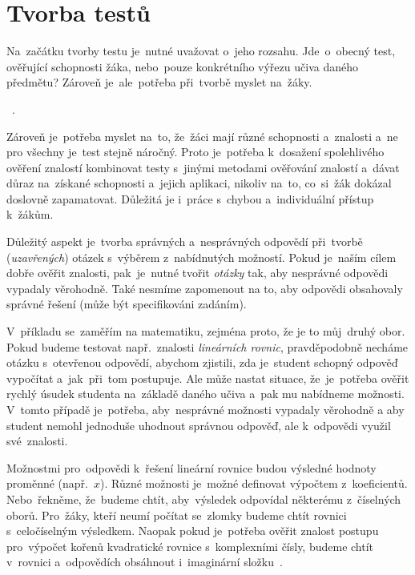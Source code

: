 \documentclass[11pt,a4paper]{report}
\begin{document}
        \section{Tvorba testů}
            Na~začátku tvorby testu je~nutné uvažovat o~jeho rozsahu. Jde~o~obecný test, ověřující schopnosti žáka, nebo~pouze konkrétního výřezu učiva daného předmětu?
            Zároveň je~ale~potřeba při~tvorbě myslet na~žáky.

            ~\cite{Suchoradsky:testy}.

            Zároveň je~potřeba myslet na~to, že~žáci mají různé schopnosti a~znalosti a~ne pro všechny je~test stejně náročný. Proto je~potřeba k~dosažení spolehlivého ověření znalostí kombinovat testy s~jinými metodami ověřování znalostí a~dávat důraz na~získané schopnosti a~jejich aplikaci, nikoliv na~to, co~si~žák dokázal doslovně zapamatovat. Důležitá je i~práce s~chybou a~individuální přístup k~žákům. \cite{chraska:testy, Berkley2017LearningFromErrors}
            
            Důležitý aspekt je~tvorba správných a~nesprávných odpovědí při~tvorbě (\emph{uzavřených}) otázek s~výběrem z~nabídnutých možností. Pokud je~naším cílem dobře ověřit znalosti, pak~je~nutné tvořit \emph{otázky} tak, aby nesprávné odpovědi vypadaly věrohodně. Také nesmíme zapomenout na to, aby odpovědi obsahovaly správné řešení (může být specifikováni zadáním).

            V~příkladu se~zaměřím na matematiku, zejména proto, že je to můj~druhý obor. Pokud budeme testovat např.~znalosti \emph{lineárních rovnic}, pravděpodobně necháme otázku s~otevřenou odpovědí, abychom zjistili, zda je~student schopný odpověď vypočítat a~jak~při~tom postupuje. Ale může nastat situace, že~je~potřeba ověřit rychlý úsudek studenta na~základě daného učiva a~pak mu nabídneme možnosti. V~tomto případě je~potřeba, aby~nesprávné možnosti vypadaly věrohodně a aby student nemohl jednoduše uhodnout správnou odpověď, ale k~odpovědi využil své~znalosti.

            Možnostmi pro~odpovědi k~řešení lineární rovnice budou výsledné hodnoty proměnné (např.~$x$). Různé možnosti je~možné definovat výpočtem z~koeficientů. Nebo~řekněme, že~budeme chtít, aby~výsledek odpovídal některému z~číselných oborů. Pro~žáky, kteří neumí počítat se~zlomky budeme chtít rovnici s~celočíselným výsledkem. Naopak pokud je~potřeba ověřit znalost postupu pro~výpočet kořenů kvadratické rovnice s~komplexními čísly, budeme chtít v~rovnici a~odpovědích obsáhnout i~imaginární složku~\cite{zhouf:tvorbamatproblemu}.
\end{document}
